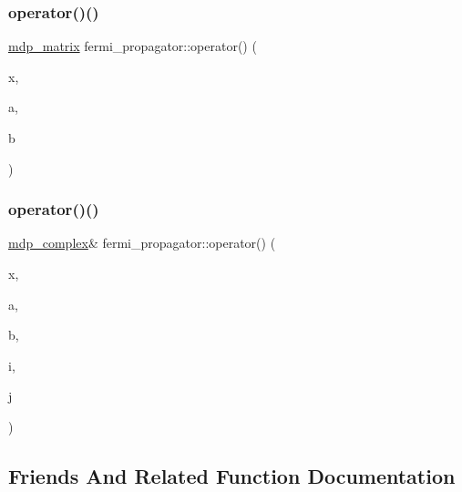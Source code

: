 \mbox{\label{classfermi__propagator_afb016830eaa4959a21901d5895adb4bc}} 
\subsubsection{\texorpdfstring{operator()()}{operator()()}\hspace{0.1cm}{\footnotesize\ttfamily [1/2]}}
{\footnotesize\ttfamily \hyperlink{classmdp__matrix}{mdp\+\_\+matrix} fermi\+\_\+propagator\+::operator() (\begin{DoxyParamCaption}\item[{\hyperlink{mdp__compatibility__macros_8h_aa6f1179c424e48adef1cedf7c436eb75}{site}}]{x,  }\item[{int}]{a,  }\item[{int}]{b }\end{DoxyParamCaption})\hspace{0.3cm}{\ttfamily [inline]}}

\mbox{\label{classfermi__propagator_a8552fbd45ff1fd6b450353713dc21bcd}} 
\subsubsection{\texorpdfstring{operator()()}{operator()()}\hspace{0.1cm}{\footnotesize\ttfamily [2/2]}}
{\footnotesize\ttfamily \hyperlink{classmdp__complex}{mdp\+\_\+complex}\& fermi\+\_\+propagator\+::operator() (\begin{DoxyParamCaption}\item[{\hyperlink{mdp__compatibility__macros_8h_aa6f1179c424e48adef1cedf7c436eb75}{site}}]{x,  }\item[{int}]{a,  }\item[{int}]{b,  }\item[{int}]{i,  }\item[{int}]{j }\end{DoxyParamCaption})\hspace{0.3cm}{\ttfamily [inline]}}



\subsection{Friends And Related Function Documentation}
\mbox{\label{classfermi__propagator_a0b3730ff1e1058f1e13b537d429c7333}} 
